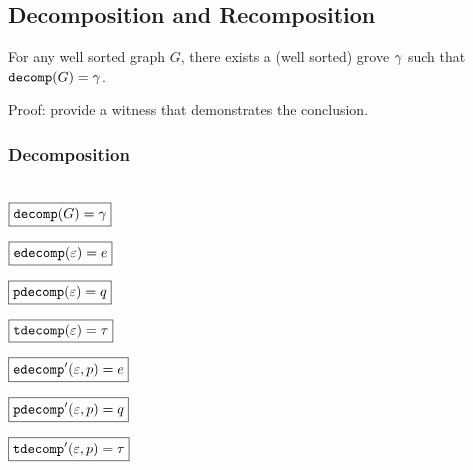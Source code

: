 
\subsection{Decomposition and Recomposition}

\begin{theorem}
  For any well sorted graph $G$,
  there exists a (well sorted) grove $\Grove$
  such that $\decomp{G} = \Grove$.
\end{theorem}

Proof: provide a witness that demonstrates the conclusion.



\figureDecompositionDefHelpersContent


\subsubsection{Decomposition}\hspace*{\fill} \\

\noindent $\boxed{\decomp{G} = \Grove}$
%
\figureDecompositionDefDecomp

\noindent $\boxed{\edecomp{\e} = e}$
%
\figureDecompositionDefEdecomp

\noindent $\boxed{\pdecomp{\e} = q}$
%
\figureDecompositionDefPdecomp

\noindent $\boxed{\tdecomp{\e} = \tau}$
%
\figureDecompositionDefTdecomp

\noindent $\boxed{\edecompPrime{\e}{p} = e}$
%
\figureDecompositionDefEdecompPrime

\noindent $\boxed{\pdecompPrime{\e}{p} = q}$
%
\figureDecompositionDefPdecompPrime

\noindent $\boxed{\tdecompPrime{\e}{p} = \tau}$
%
\figureDecompositionDefTdecompPrime%

